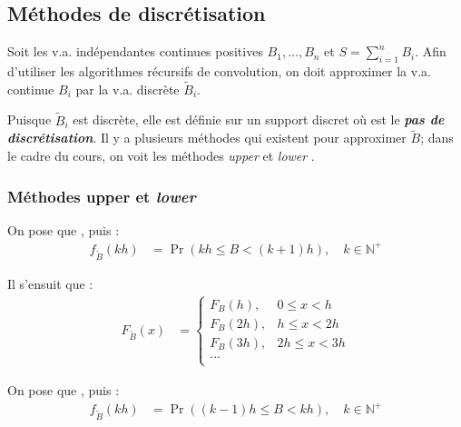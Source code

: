 \documentclass[10pt, french]{article}
\begin{document}
\begin{multicols*}{2}
\columnbreak
\subsection{Méthodes de discrétisation}
\begin{rappel_enhanced}[Contexte]
Soit les v.a. indépendantes continues positives $B_{1}, \dots, B_{n}$ et $S	=	\sum_{i	=	1}^{n}B_{i}$. Afin d'utiliser les algorithmes récursifs de convolution, on doit approximer la v.a. continue $B_{i}$ par la v.a. discrète $\tilde{B}_{i}$. 

\bigskip

Puisque $\tilde{B}_{i}$ est discrète, elle est définie sur un support discret  où  est le \textit{\textbf{pas de discrétisation}}. Il y a plusieurs méthodes qui existent pour approximer $\tilde{B}$; dans le cadre du cours, on voit les méthodes \og \textit{upper} \fg{} et \og \textit{lower} \fg{}.
\end{rappel_enhanced}



\subsubsection{Méthodes \textbf{upper} et \textit{lower}}
\begin{definitionNOHFILLsub}
On pose que , puis :
\begin{align*}
	f_{\tilde{B}}(kh)
	&=	\Pr(kh	\leq	B	<	(k + 1)h), \quad k \in \mathbb{N}^{+}
\end{align*}

\bigskip

Il s'ensuit que :
\begin{align*}
	F_{\tilde{B}}(x)
	&=	\begin{cases}
		F_{B}(h),	&	0	\leq	x	<	h	\\
		F_{B}(2h),	&	h	\leq	x	<	2h	\\
		F_{B}(3h),	&	2h	\leq	x	<	3h	\\
		...	&	\\
		\end{cases}
\end{align*}
\end{definitionNOHFILLsub}

\begin{definitionNOHFILLsub}
On pose que , puis :
\begin{align*}
	f_{\tilde{B}}(kh)
	&=	\Pr((k - 1)h	\leq	B	<	kh), \quad k \in \mathbb{N}^{+}
\end{align*}


\end{definitionNOHFILLsub}
\end{multicols*}
\end{document}
